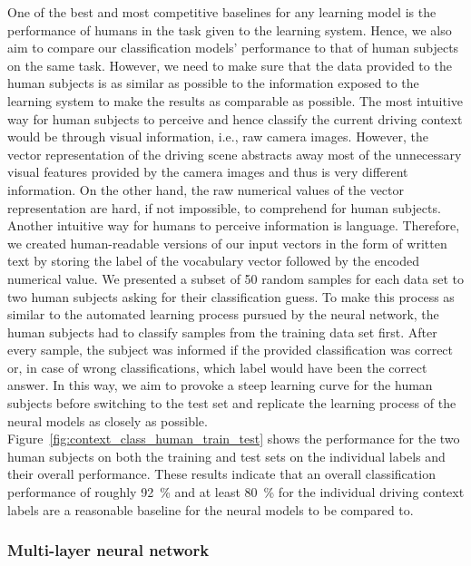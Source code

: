 One of the best and most competitive baselines for any learning model is the performance of humans in the task given to the learning system.
Hence, we also aim to compare our classification models' performance to that of human subjects on the same task.
However, we need to make sure that the data provided to the human subjects is as similar as possible to the information exposed to the learning system to make the results as comparable as possible.
The most intuitive way for human subjects to perceive and hence classify the current driving context would be through visual information, i.e., raw camera images.
However, the vector representation of the driving scene abstracts away most of the unnecessary visual features provided by the camera images and thus is very different information.
On the other hand, the raw numerical values of the vector representation are hard, if not impossible, to comprehend for human subjects.
Another intuitive way for humans to perceive information is language.
Therefore, we created human-readable versions of our input vectors in the form of written text by storing the label of the vocabulary vector followed by the encoded numerical value.
We presented a subset of \num{50} random samples for each data set to two human subjects asking for their classification guess.
To make this process as similar to the automated learning process pursued by the neural network, the human subjects had to classify samples from the training data set first.
After every sample, the subject was informed if the provided classification was correct or, in case of wrong classifications, which label would have been the correct answer.
In this way, we aim to provoke a steep learning curve for the human subjects before switching to the test set and replicate the learning process of the neural models as closely as possible.
Figure~\ref{fig:context_class_human_train_test} shows the performance for the two human subjects on both the training and test sets on the individual labels and their overall performance.
These results indicate that an overall classification performance of roughly \SI{92}{\percent} and at least \SI{80}{\percent} for the individual driving context labels are a reasonable baseline for the neural models to be compared to.

\subsubsection{Multi-layer neural network}%
\label{ssubsec:multi_layer_neural_network}

